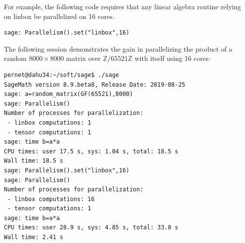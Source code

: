 \documentclass{deliverablereport}
\begin{document}
For example, the following code requires that any linear algebra routine relying on linbox be parallelized on 16 cores.

\begin{lstlisting}
sage: Parallelism().set("linbox",16)
\end{lstlisting}

The following session demonstrates the gain in parallelizing the product of a random $8000\times 8000$ matrix over
$\mathbb{Z}/65521\mathbb{Z}$ with itself using 16 cores:
\begin{lstlisting}
pernet@dahu34:~/soft/sage$ ./sage 
SageMath version 8.9.beta8, Release Date: 2019-08-25
sage: a=random_matrix(GF(65521),8000)
sage: Parallelism()
Number of processes for parallelization:
 - linbox computations: 1
 - tensor computations: 1
sage: time b=a*a
CPU times: user 17.5 s, sys: 1.04 s, total: 18.5 s
Wall time: 18.5 s
sage: Parallelism().set("linbox",16)
sage: Parallelism()
Number of processes for parallelization:
 - linbox computations: 16
 - tensor computations: 1
sage: time b=a*a
CPU times: user 28.9 s, sys: 4.85 s, total: 33.8 s
Wall time: 2.41 s
\end{lstlisting}
\end{document}
